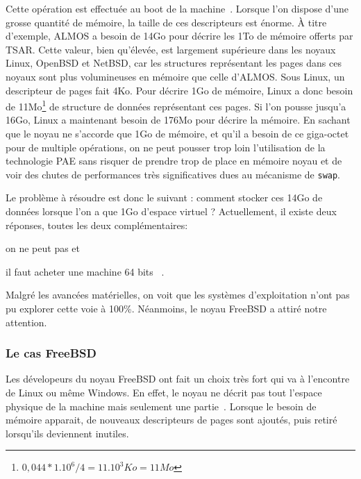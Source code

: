       Cette opération est effectuée au boot de la machine~\citep{cranor1999uvm,
        gorman2004understanding, russinovich2012windows}. Lorsque l’on dispose
      d’une grosse quantité de mémoire, la taille de ces descripteurs est
      énorme. À titre d’exemple, ALMOS a besoin de 14Go pour décrire les 1To de
      mémoire offerts par TSAR. Cette valeur, bien qu’élevée, est largement
      supérieure dans les noyaux Linux, OpenBSD et NetBSD, car les structures
      représentant les pages dans ces noyaux sont plus volumineuses en mémoire
      que celle d’ALMOS. Sous Linux, un descripteur de pages fait 4Ko. Pour
      décrire 1Go de mémoire, Linux a donc besoin de 11Mo\footnote{$0,044*1.10^6/4 = 11.10^3Ko = 11Mo$} de
      structure de données représentant ces pages. Si l'on pousse jusqu'a 16Go,
      Linux a maintenant besoin de 176Mo pour décrire la mémoire. En sachant que
      le noyau ne s'accorde que 1Go de mémoire, et qu'il a besoin de ce
      giga-octet pour de multiple opérations, on ne peut pousser trop loin
      l'utilisation de la technologie PAE sans risquer de prendre trop de place
      en mémoire noyau et de voir des chutes de performances très significatives
      dues au mécanisme de \texttt{swap}.

      Le problème à résoudre est donc le suivant : comment stocker ces 14Go de
      données lorsque l’on a que 1Go d’espace virtuel ?  Actuellement, il existe
      deux réponses, toutes les deux complémentaires: \benumline \item on ne
      peut pas et \item il faut acheter une machine 64
      bits~\citep{gorman2004understanding} \eenumline.

      Malgré les avancées matérielles, on voit que les systèmes d'exploitation
      n'ont pas pu explorer cette voie à 100\%. Néanmoins, le noyau FreeBSD a
      attiré notre attention.


      \subsubsection{Le cas FreeBSD}

        Les dévelopeurs du noyau FreeBSD ont fait un choix très fort qui va à
        l'encontre de Linux ou même Windows. En effet, le noyau ne décrit pas
        tout l'espace physique de la machine mais seulement une
        partie~\citep{kernelfreebsd, mckusick1996design}. Lorsque le besoin de
        mémoire apparait, de nouveaux descripteurs de pages sont ajoutés, puis
        retiré lorsqu'ils deviennent inutiles.
      

